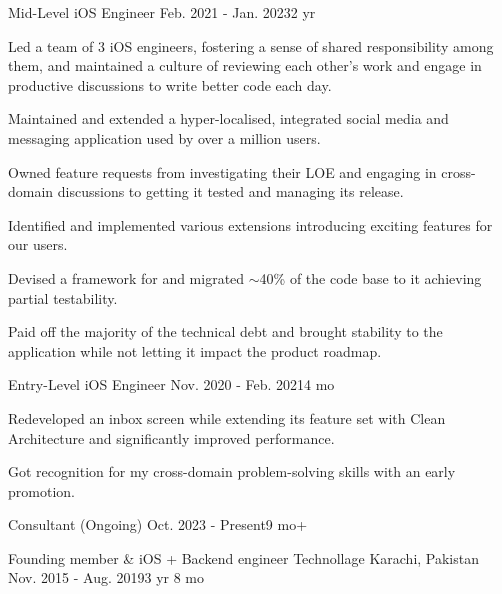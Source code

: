 \begin{cventries}
  \cventry
  {Mid-Level iOS Engineer} %
  {} %
  {} %
  {Feb. 2021 - Jan. 2023{\enskip\cdotp\enskip}2 yr} %
  {
    \begin{cvitems} %
      \item {Led a team of 3 iOS engineers, fostering a sense of shared responsibility among them, and maintained a culture of reviewing each other's work and engage in productive discussions to write better code each day.}
      \item {Maintained and extended a hyper-localised, integrated social media and messaging application used by over a million users.}
      \item {Owned feature requests from investigating their LOE and engaging in cross-domain discussions to getting it tested and managing its release.}
      \item {Identified and implemented various  extensions introducing exciting features for our users.}
      \item {Devised a framework for  and migrated $\sim$40\% of the code base to it achieving partial testability.}
      \item {Paid off the majority of the technical debt and brought stability to the application while not letting it impact the product roadmap.}
    \end{cvitems}
  }

  \cventry
  {Entry-Level iOS Engineer} %
  {} %
  {} %
  {Nov. 2020 - Feb. 2021{\enskip\cdotp\enskip}4 mo} %
  {
    \begin{cvitems} %
      \item {Redeveloped an inbox screen while extending its feature set with Clean Architecture and significantly improved performance.}
      \item {Got recognition for my cross-domain problem-solving skills with an early promotion.}
    \end{cvitems}
  }

  \cventry
  {Consultant (Ongoing)} %
  {}
  {}
  {Oct. 2023 - Present{\enskip\cdotp\enskip}9 mo+} %
  {
  }

  \cventry
  {Founding member \& iOS + Backend engineer} %
  {Technollage} %
  {Karachi, Pakistan} %
  {Nov. 2015 - Aug. 2019{\enskip\cdotp\enskip}3 yr 8 mo} %
  {
  }

\end{cventries}

